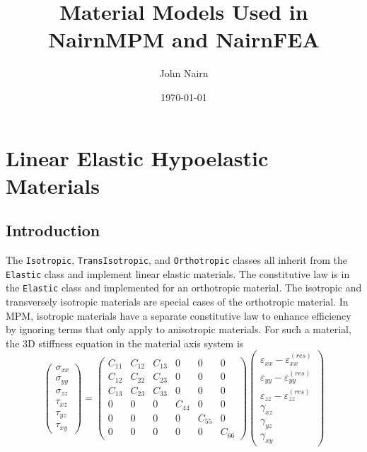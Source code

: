 \documentclass[11pt]{book}
\title{Material Models Used in NairnMPM and NairnFEA}
\author{John Nairn}
\date{\today}
\def\code#1{{\small\tt #1}}
\def\e#1{\varepsilon_{#1}}
\def\er#1{\varepsilon_{#1}^{(res)}}
\def\g#1{\gamma_{#1}}
\def\s#1{\sigma_{#1}}
\def\t#1{\tau_{#1}}
\begin{document}
\maketitle

\tableofcontents

\chapter{Linear Elastic Hypoelastic Materials}

\section{Introduction}

The \code{Isotropic}, \code{TransIsotropic}, and \code{Orthotropic} classes all inherit from the \code{Elastic} class and implement linear elastic materials. The constitutive law is in the \code{Elastic} class and implemented for an orthotropic material. The isotropic and transversely isotropic materials are special cases of the orthotropic material. In MPM, isotropic materials have a separate constitutive law to enhance efficiency by ignoring terms that only apply to anisotropic materials. For such a material, the 3D stiffness equation in the material axis system is
\begin{equation}
     \left(\begin{array}{c} \s{xx} \\ \s{yy} \\ \s{zz} \\ \t{xz} \\ \t{yz} \\ \t{xy} \end{array}\right)
       =  \left(\begin{array}{cccccc}
      C_{11} & C_{12} & C_{13} & 0 & 0 & 0 \\
      C_{12} & C_{22} & C_{23} & 0 & 0 & 0 \\
      C_{13} & C_{23} & C_{33} & 0 & 0 & 0 \\
      0 & 0 & 0 & C_{44} & 0 & 0 \\
      0 & 0 & 0 & 0 & C_{55} & 0  \\
      0 & 0 & 0 & 0 & 0 &  C_{66}  \end{array}\right)
     \left(\begin{array}{c} \e{xx} -\er{xx} \\ \e{yy} -\er{yy} \\ \e{zz} -\er{zz}\\ 
                   \g{xz} \\ \g{yz} \\ \g{xy} \end{array}\right)
\end{equation}
\end{document}
